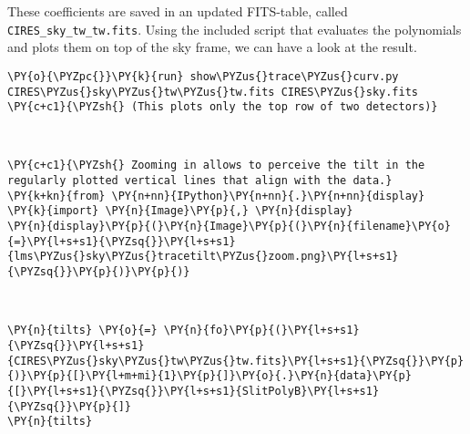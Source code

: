 These coefficients are saved in an updated FITS-table, called
\texttt{CIRES\_sky\_tw\_tw.fits}. Using the included script that
evaluates the polynomials and plots them on top of the sky frame, we can
have a look at the result.

    \begin{tcolorbox}[breakable, size=fbox, boxrule=1pt, pad at break*=1mm,colback=cellbackground, colframe=cellborder]
\begin{Verbatim}[commandchars=\\\{\}]
\PY{o}{\PYZpc{}}\PY{k}{run} show\PYZus{}trace\PYZus{}curv.py CIRES\PYZus{}sky\PYZus{}tw\PYZus{}tw.fits CIRES\PYZus{}sky.fits
\PY{c+c1}{\PYZsh{} (This plots only the top row of two detectors)}
\end{Verbatim}
\end{tcolorbox}

    \begin{center}
    \end{center}
    { \hspace*{\fill} \\}
    
    \begin{tcolorbox}[breakable, size=fbox, boxrule=1pt, pad at break*=1mm,colback=cellbackground, colframe=cellborder]
\begin{Verbatim}[commandchars=\\\{\}]
\PY{c+c1}{\PYZsh{} Zooming in allows to perceive the tilt in the regularly plotted vertical lines that align with the data.}
\PY{k+kn}{from} \PY{n+nn}{IPython}\PY{n+nn}{.}\PY{n+nn}{display} \PY{k}{import} \PY{n}{Image}\PY{p}{,} \PY{n}{display}
\PY{n}{display}\PY{p}{(}\PY{n}{Image}\PY{p}{(}\PY{n}{filename}\PY{o}{=}\PY{l+s+s1}{\PYZsq{}}\PY{l+s+s1}{lms\PYZus{}sky\PYZus{}tracetilt\PYZus{}zoom.png}\PY{l+s+s1}{\PYZsq{}}\PY{p}{)}\PY{p}{)}
\end{Verbatim}
\end{tcolorbox}

    \begin{center}
    \end{center}
    { \hspace*{\fill} \\}
    
    \begin{tcolorbox}[breakable, size=fbox, boxrule=1pt, pad at break*=1mm,colback=cellbackground, colframe=cellborder]
\begin{Verbatim}[commandchars=\\\{\}]
\PY{n}{tilts} \PY{o}{=} \PY{n}{fo}\PY{p}{(}\PY{l+s+s1}{\PYZsq{}}\PY{l+s+s1}{CIRES\PYZus{}sky\PYZus{}tw\PYZus{}tw.fits}\PY{l+s+s1}{\PYZsq{}}\PY{p}{)}\PY{p}{[}\PY{l+m+mi}{1}\PY{p}{]}\PY{o}{.}\PY{n}{data}\PY{p}{[}\PY{l+s+s1}{\PYZsq{}}\PY{l+s+s1}{SlitPolyB}\PY{l+s+s1}{\PYZsq{}}\PY{p}{]}
\PY{n}{tilts}
\end{Verbatim}
\end{tcolorbox}

